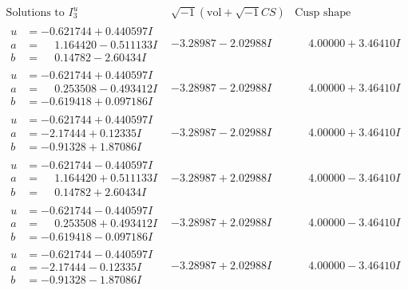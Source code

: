 \documentclass[1p]{elsarticle_modified}
\theoremstyle{definition}
\newcommand{\I}{\sqrt{-1}}
\begin{document}
$$\begin{array}{c|c|c}  
\text{Solutions to }I^u_{3}& \I (\text{vol} + \sqrt{-1}CS) & \text{Cusp shape}\\
 \hline 
\begin{aligned}
u &= -0.621744 + 0.440597 I \\
a &= \phantom{-}1.164420 - 0.511133 I \\
b &= \phantom{-}0.14782 - 2.60434 I\end{aligned}
 & -3.28987 - 2.02988 I & \phantom{-}4.00000 + 3.46410 I \\ \hline\begin{aligned}
u &= -0.621744 + 0.440597 I \\
a &= \phantom{-}0.253508 - 0.493412 I \\
b &= -0.619418 + 0.097186 I\end{aligned}
 & -3.28987 - 2.02988 I & \phantom{-}4.00000 + 3.46410 I \\ \hline\begin{aligned}
u &= -0.621744 + 0.440597 I \\
a &= -2.17444 + 0.12335 I \\
b &= -0.91328 + 1.87086 I\end{aligned}
 & -3.28987 - 2.02988 I & \phantom{-}4.00000 + 3.46410 I \\ \hline\begin{aligned}
u &= -0.621744 - 0.440597 I \\
a &= \phantom{-}1.164420 + 0.511133 I \\
b &= \phantom{-}0.14782 + 2.60434 I\end{aligned}
 & -3.28987 + 2.02988 I & \phantom{-}4.00000 - 3.46410 I \\ \hline\begin{aligned}
u &= -0.621744 - 0.440597 I \\
a &= \phantom{-}0.253508 + 0.493412 I \\
b &= -0.619418 - 0.097186 I\end{aligned}
 & -3.28987 + 2.02988 I & \phantom{-}4.00000 - 3.46410 I \\ \hline\begin{aligned}
u &= -0.621744 - 0.440597 I \\
a &= -2.17444 - 0.12335 I \\
b &= -0.91328 - 1.87086 I\end{aligned}
 & -3.28987 + 2.02988 I & \phantom{-}4.00000 - 3.46410 I \\ \hline\begin{aligned}

\end{aligned}
\end{array}$$
\end{document}
